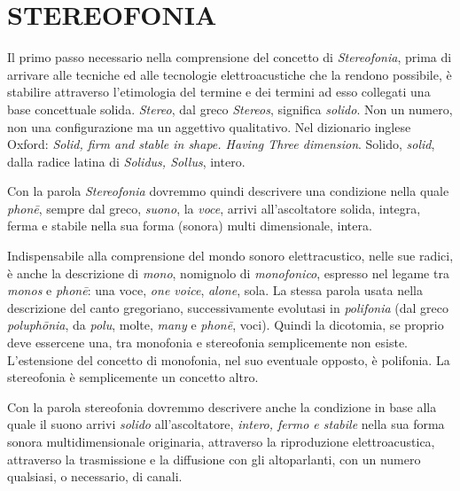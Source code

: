 
\chapter{STEREOFONIA}
\startcontents[chapters]

\vfill\null

Il primo passo necessario nella comprensione del concetto di \emph{Stereofonia},
prima di arrivare alle tecniche ed alle tecnologie elettroacustiche che la
rendono possibile, è stabilire attraverso l'etimologia del termine e dei
termini ad esso collegati una base concettuale solida. \emph{Stereo}, dal greco
\emph{Stereos}, significa \emph{solido}. Non un numero, non una configurazione
ma un aggettivo qualitativo. Nel dizionario inglese Oxford: \emph{Solid, firm
and stable in shape. Having Three dimension}. Solido, \emph{solid}, dalla radice
latina di \emph{Solidus, Sollus}, intero.

Con la parola \emph{Stereofonia} dovremmo quindi descrivere una condizione
nella quale \emph{phon\={e}}, sempre dal greco, \emph{suono}, la \emph{voce},
arrivi all'ascoltatore solida, integra, ferma e stabile nella sua forma (sonora)
multi dimensionale, intera.

Indispensabile alla comprensione del mondo sonoro elettracustico, nelle sue
radici, è anche la descrizione di \emph{mono}, nomignolo di \emph{monofonico},
espresso nel legame tra \emph{monos} e \emph{phon\={e}}: una voce,
\emph{one voice}, \emph{alone}, sola. La stessa parola usata nella descrizione
del canto gregoriano, successivamente evolutasi in \emph{polifonia} (dal greco
\emph{poluph\={o}nia}, da \emph{polu}, molte, \emph{many} e \emph{phon\={e}},
voci). Quindi la dicotomia, se proprio deve essercene una, tra monofonia e
stereofonia semplicemente non esiste. L'estensione del concetto di monofonia,
nel suo eventuale opposto, è polifonia. La stereofonia è semplicemente un
concetto altro.

Con la parola stereofonia dovremmo descrivere anche la condizione in base alla
quale il suono arrivi \emph{solido} all'ascoltatore, \emph{intero, fermo e
stabile} nella sua forma sonora multidimensionale originaria, attraverso
la riproduzione elettroacustica, attraverso la trasmissione e la diffusione con
gli altoparlanti, con un numero qualsiasi, o necessario, di canali.

\clearpage



\clearpage


